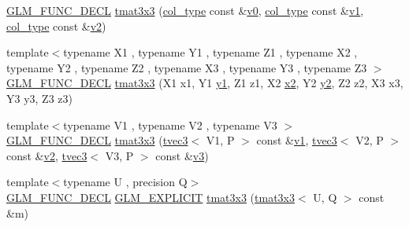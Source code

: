 \begin{DoxyCompactItemize}
\mbox{\hyperlink{setup_8hpp_ab2d052de21a70539923e9bcbf6e83a51}{G\+L\+M\+\_\+\+F\+U\+N\+C\+\_\+\+D\+E\+CL}} \mbox{\hyperlink{structglm_1_1tmat3x3_a600f68b1c8033fa18fb64fc3dfd5b6eb}{tmat3x3}} (\mbox{\hyperlink{structglm_1_1tmat3x3_a0b80bddb3cb4e01aa04d1c7a5a47365a}{col\+\_\+type}} const \&\mbox{\hyperlink{glad_8h_a7062a23d1d434121d4a88f530703d06a}{v0}}, \mbox{\hyperlink{structglm_1_1tmat3x3_a0b80bddb3cb4e01aa04d1c7a5a47365a}{col\+\_\+type}} const \&\mbox{\hyperlink{glad_8h_a0779c3b73f9aa3a0ac5b0139b5d291d9}{v1}}, \mbox{\hyperlink{structglm_1_1tmat3x3_a0b80bddb3cb4e01aa04d1c7a5a47365a}{col\+\_\+type}} const \&\mbox{\hyperlink{glad_8h_a9a09a1837922b2b806f4589096a52049}{v2}})
\item 
{\footnotesize template$<$typename X1 , typename Y1 , typename Z1 , typename X2 , typename Y2 , typename Z2 , typename X3 , typename Y3 , typename Z3 $>$ }\\\mbox{\hyperlink{setup_8hpp_ab2d052de21a70539923e9bcbf6e83a51}{G\+L\+M\+\_\+\+F\+U\+N\+C\+\_\+\+D\+E\+CL}} \mbox{\hyperlink{structglm_1_1tmat3x3_a02ca559b77e60d87c9511b1da01181c9}{tmat3x3}} (X1 x1, Y1 \mbox{\hyperlink{glad_8h_a48340161068d267815ac3131e9d03def}{y1}}, Z1 z1, X2 \mbox{\hyperlink{glad_8h_ad2cea6eadb01f017f0d57e7edf0ce988}{x2}}, Y2 \mbox{\hyperlink{glad_8h_af7158b5d27f7a6aa4ab9973fcc3a5c20}{y2}}, Z2 z2, X3 x3, Y3 y3, Z3 z3)
\item 
{\footnotesize template$<$typename V1 , typename V2 , typename V3 $>$ }\\\mbox{\hyperlink{setup_8hpp_ab2d052de21a70539923e9bcbf6e83a51}{G\+L\+M\+\_\+\+F\+U\+N\+C\+\_\+\+D\+E\+CL}} \mbox{\hyperlink{structglm_1_1tmat3x3_aa124ab387668b4444834f36fb7b02a9d}{tmat3x3}} (\mbox{\hyperlink{structglm_1_1tvec3}{tvec3}}$<$ V1, P $>$ const \&\mbox{\hyperlink{glad_8h_a0779c3b73f9aa3a0ac5b0139b5d291d9}{v1}}, \mbox{\hyperlink{structglm_1_1tvec3}{tvec3}}$<$ V2, P $>$ const \&\mbox{\hyperlink{glad_8h_a9a09a1837922b2b806f4589096a52049}{v2}}, \mbox{\hyperlink{structglm_1_1tvec3}{tvec3}}$<$ V3, P $>$ const \&\mbox{\hyperlink{glad_8h_acc806b31cbf466ceba6555983d8b814d}{v3}})
\item 
{\footnotesize template$<$typename U , precision Q$>$ }\\\mbox{\hyperlink{setup_8hpp_ab2d052de21a70539923e9bcbf6e83a51}{G\+L\+M\+\_\+\+F\+U\+N\+C\+\_\+\+D\+E\+CL}} \mbox{\hyperlink{setup_8hpp_a6c74f5a5e7b134ab69023ff9a30d4d5d}{G\+L\+M\+\_\+\+E\+X\+P\+L\+I\+C\+IT}} \mbox{\hyperlink{structglm_1_1tmat3x3_a7c44285c419a7485e7e558ee66c2a147}{tmat3x3}} (\mbox{\hyperlink{structglm_1_1tmat3x3}{tmat3x3}}$<$ U, Q $>$ const \&m)

\end{DoxyCompactItemize}
